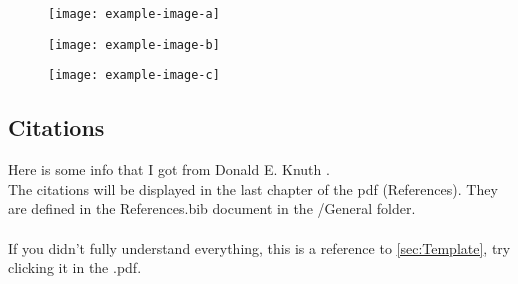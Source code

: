 \begin{figure}[h]
\centering
\begin{minipage}{0.3\textwidth}
  \centering
  \texttt{[image: example-image-a]}
  \label{fig: style 2 image a}
\end{minipage}
\hfill
\begin{minipage}{0.3\textwidth}
  \centering
  \texttt{[image: example-image-b]}
  \label{fig: style 2 image b}
\end{minipage}
\hfill
\begin{minipage}{0.3\textwidth}
  \centering
  \texttt{[image: example-image-c]}
  \label{fig: style 2 image c}
\end{minipage}
\end{figure}


\subsection{Citations}
Here is some info that I got from Donald E. Knuth \cite{texbook}. \\
The citations will be displayed in the last chapter of the pdf (References). They are defined in the References.bib document in the /General folder. \\
\\
If you didn't fully understand everything, this is a reference to \cref{sec:Template}, try clicking it in the .pdf. 


